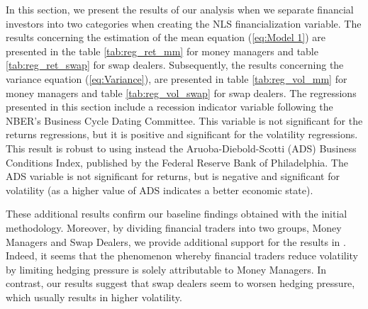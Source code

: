 \documentclass[12pt]{article}
\begin{document}
 In this section, we present the results of our analysis when we separate financial investors into two categories when creating the NLS financialization variable. The results concerning the estimation of the mean equation (\ref{eq:Model 1}) are presented in the table \ref{tab:reg_ret_mm} for money managers and table \ref{tab:reg_ret_swap} for swap dealers.  Subsequently, the results concerning the variance equation (\ref{eq:Variance}), are presented in table \ref{tab:reg_vol_mm} for money managers and table \ref{tab:reg_vol_swap} for swap dealers.
The regressions presented in this section include a recession indicator variable following the NBER's Business Cycle Dating Committee. This variable is not significant for the returns regressions, but it is positive and significant for the volatility regressions. This result is robust to using instead the Aruoba-Diebold-Scotti (ADS) Business Conditions Index, published by the Federal Reserve Bank of Philadelphia. The ADS variable is not significant for returns, but is negative and significant for volatility (as a higher value of ADS indicates a better economic state).

 
These additional results confirm our baseline findings obtained with the initial methodology. Moreover, by dividing financial traders into two groups, Money Managers and Swap Dealers, we provide additional support for the results in \citet{brunetti2016speculators}. Indeed, it seems that the phenomenon whereby financial traders reduce volatility by limiting hedging pressure is solely attributable to Money Managers. In contrast, our results suggest that swap dealers seem to worsen hedging pressure, which usually results in higher volatility.

 
\end{document}
